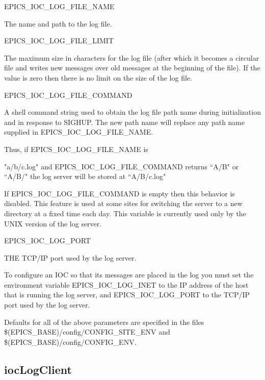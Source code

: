 \begin{description}

\item {}EPICS\_IOC\_LOG\_FILE\_NAME 

The name and path to the log file.

\item {}EPICS\_IOC\_LOG\_FILE\_LIMIT

The maximum size in characters for the log file (after which it becomes a circular file and writes new 
messages over old  messages at the beginning of the file). If the value is zero then there is no limit on the 
size of the log file. 

\item {}EPICS\_IOC\_LOG\_FILE\_COMMAND

A shell command string used to obtain the log file path name during initialization and in response to 
SIGHUP. The new path name will replace any path name supplied in EPICS\_IOC\_LOG\_FILE\_NAME.

Thus, if EPICS\_IOC\_LOG\_FILE\_NAME is 

"a/b/c.log" and EPICS\_IOC\_LOG\_FILE\_COMMAND returns ``A/B" or ``A/B/" the log server will be stored 
at ``A/B/c.log"

If EPICS\_IOC\_LOG\_FILE\_COMMAND is empty then this behavior is disabled. This feature is used at 
some sites for switching the server to a new directory at a fixed time each day. This variable is currently 
used only by the UNIX version of the log server.

\item {}EPICS\_IOC\_LOG\_PORT

THE TCP/IP port used by the log server.

\end{description}

To configure an IOC so that its messages are placed in the log you must set the environment variable 
EPICS\_IOC\_LOG\_INET to the IP address of the host that is running the log server, and EPICS\_IOC\_LOG\_PORT to the 
TCP/IP port used by the log server.

Defaults for all of the above parameters are specified in  the files \$(EPICS\_BASE)/config/CONFIG\_SITE\_ENV and 
\$(EPICS\_BASE)/config/CONFIG\_ENV.

\subsection{iocLogClient}
\label{iocLogClient}

